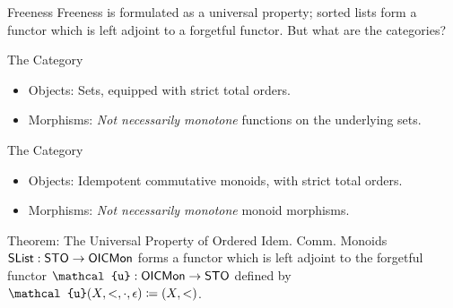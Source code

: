 \documentclass[aspectratio=169]{beamer}
\begin{document}
\begin{frame}{Freeness}
  Freeness is formulated as a universal property; sorted lists form a functor which is left adjoint to a forgetful functor.
  But what are the categories?

  \bigskip
  \pause

\begin{block}{The Category }
\begin{itemize}
  \item Objects: Sets, equipped with strict total orders.
  \item Morphisms: \emph{Not necessarily monotone} functions on the underlying sets.
\end{itemize}
\end{block}

\begin{block}{The Category }
\begin{itemize}
  \item Objects: Idempotent commutative monoids, with strict total orders.
  \item Morphisms: \emph{Not necessarily monotone} monoid morphisms.
\end{itemize}
\end{block}

\bigskip
\pause

\begin{block}{Theorem: The Universal Property of Ordered Idem. Comm. Monoids}
   $\AgdaDatatype{SList} : \AgdaDatatype{STO} \to \AgdaDatatype{OICMon}$ forms a functor which is left adjoint to the forgetful functor $\AgdaDatatype{\ensuremath{\mathcal{u}}} : \AgdaDatatype{OICMon} \to \AgdaDatatype{STO}$ defined by $\AgdaDatatype{\ensuremath{\mathcal{u}}}(X,<,\cdot,\epsilon) \coloneq (X,<)$.
 \end{block}
\end{frame}
\end{document}
